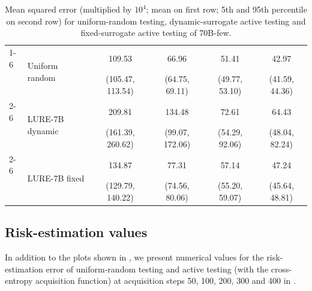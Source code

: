 \begin{table}[h]
\begin{tabular}{l l c c c c}
        \cline{1-6}
        \multirow{6}{*}{Subj}& \multirow{2}{*}{Uniform random} & 109.53 &	66.96 &	51.41 &	42.97 \\
        &&(105.47, 113.54) &(64.75, 69.11) &(49.77, 53.10) &(41.59, 44.36) \\
        \cline{2-6}
        & \multirow{2}{*}{LURE-7B dynamic} & 209.81 &	134.48 &	72.61 &	64.43 \\
        &&(161.39, 260.62) &(99.07, 172.06) &(54.29, 92.06) &(48.04, 82.24) \\
        \cline{2-6}
        & \multirow{2}{*}{LURE-7B fixed} & 134.87 &	77.31 &	57.14 &	47.24 \\
        &&(129.79, 140.22) &(74.56, 80.06) &(55.20, 59.07) &(45.64, 48.81) \\
        \bottomrule
    \end{tabular}
    \vspace{1em}
    \caption{
        Mean squared error (multiplied by $10^4$; mean on first row; 5th and 95th percentile on second row) for uniform-random testing, dynamic-surrogate active testing and fixed-surrogate active testing of 70B-few.
    }
    \label{tab:dynamic_70b}
\end{table}


\clearpage

\subsection{Risk-estimation values}

In addition to the plots shown in , we present numerical values for the risk-estimation error of uniform-random testing and active testing (with the cross-entropy acquisition function) at acquisition steps 50, 100, 200, 300 and 400 in .


